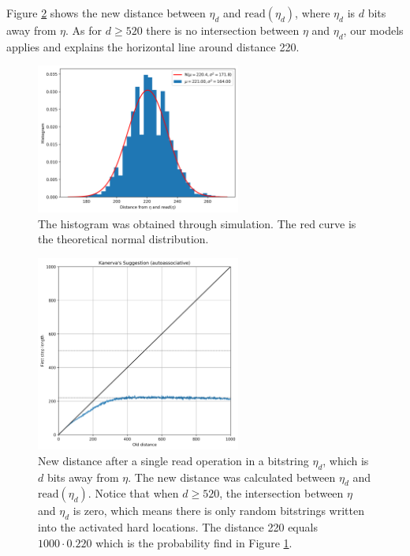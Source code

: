 Figure \ref{fig:sdm-single-read-dist} shows the new distance between $\eta_d$ and $\text{read}(\eta_d)$, where $\eta_d$ is $d$ bits away from $\eta$. As for $d \ge 520$ there is no intersection between $\eta$ and $\eta_d$, our models applies and explains the horizontal line around distance 220.

\begin{figure}[!htb]
  \centering
  \includegraphics[width=0.6\textwidth]{./images02/autocorrelation/read-random-bs.png}

  \caption{The histogram was obtained through simulation. The red curve is the theoretical normal distribution.}
  \label{fig:sdm-read-random-bs}
\end{figure}

\begin{figure}[!htb]
  \centering
  \includegraphics[width=0.6\textwidth]{./images02/autocorrelation/single-read-dist.png}

  \caption{New distance after a single read operation in a bitstring $\eta_d$, which is $d$ bits away from $\eta$. The new distance was calculated between $\eta_d$ and $\text{read}(\eta_d)$. Notice that when $d \ge 520$, the intersection between $\eta$ and $\eta_d$ is zero, which means there is only random bitstrings written into the activated hard locations. The distance 220 equals $1000 \cdot 0.220$ which is the probability find in Figure \ref{fig:sdm-read-random-bs}.}
  \label{fig:sdm-single-read-dist}
\end{figure}
